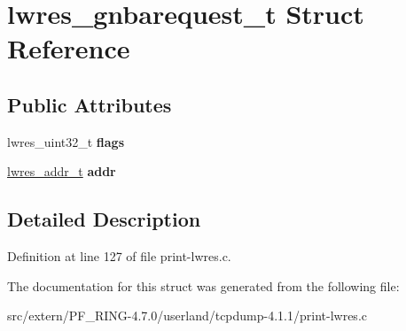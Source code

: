 \hypertarget{structlwres__gnbarequest__t}{
\section{lwres\_\-gnbarequest\_\-t Struct Reference}
\label{structlwres__gnbarequest__t}
}
\subsection*{Public Attributes}
\begin{DoxyCompactItemize}
\item 
\hypertarget{structlwres__gnbarequest__t_a019386dfc682be9f4ae499ed9bfa0108}{
lwres\_\-uint32\_\-t {\bfseries flags}}
\label{structlwres__gnbarequest__t_a019386dfc682be9f4ae499ed9bfa0108}

\item 
\hypertarget{structlwres__gnbarequest__t_a078620706c17e5e773263a3407d91585}{
\hyperlink{structlwres__addr}{lwres\_\-addr\_\-t} {\bfseries addr}}
\label{structlwres__gnbarequest__t_a078620706c17e5e773263a3407d91585}

\end{DoxyCompactItemize}


\subsection{Detailed Description}


Definition at line 127 of file print-\/lwres.c.



The documentation for this struct was generated from the following file:\begin{DoxyCompactItemize}
\item 
src/extern/PF\_\-RING-\/4.7.0/userland/tcpdump-\/4.1.1/print-\/lwres.c\end{DoxyCompactItemize}

